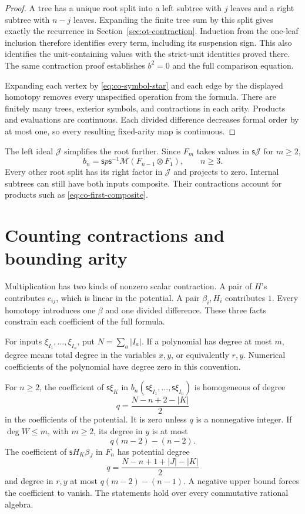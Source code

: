 \begin{proof}
A tree has a unique root split into a left subtree with \(j\) leaves
and a right subtree with \(n-j\) leaves. Expanding the finite tree
sum by this split gives exactly the recurrence in
Section~\ref{sec:ot-contraction}. Induction from the one-leaf inclusion
therefore identifies every term, including its suspension sign.
This also identifies the unit-containing values with the strict-unit
identities proved there. The same contraction proof establishes
\(b^2=0\) and the full comparison equation.

Expanding each vertex by \eqref{eq:co-symbol-star} and each edge
by the displayed homotopy removes every unspecified operation from
the formula. There are finitely many trees, exterior symbols, and
contractions in each arity. Products and evaluations are continuous.
Each divided difference decreases formal order by at most one,
so every resulting fixed-arity map is continuous.
\end{proof}

The left ideal \(\mathcal J\) simplifies the root further.
Since \(F_m\) takes values in \(\mathsf{s}\mathcal J\) for \(m\ge2\),
\[
 b_n=\mathsf{s}p\mathsf{s}^{-1}
              \mathcal M(F_{n-1}\otimes F_1),\qquad n\ge3.
\]
Every other root split has its right factor in \(\mathcal J\)
and projects to zero. Internal subtrees can still have both
inputs composite. Their contractions account for products such
as \eqref{eq:co-first-composite}.

\section{Counting contractions and bounding arity}
\label{sec:co-degree}

Multiplication has two kinds of nonzero scalar contraction.
A pair of \(H\)'s contributes \(c_{ij}\), which is linear in
the potential. A pair \(\beta_i,H_i\) contributes \(1\).
Every homotopy introduces one \(\beta\) and one divided difference.
These three facts constrain each coefficient of the full formula.

For inputs \(\xi_{I_1},\ldots,\xi_{I_n}\), put
\(N=\sum_a|I_a|\). If a polynomial has degree at most \(m\),
degree means total degree in the variables
\(x,y\), or equivalently \(r,y\). Numerical coefficients of the
polynomial have degree zero in this convention.

\begin{theorem}\label{thm:co-degree}
For \(n\ge2\), the coefficient of \(\mathsf{s}\xi_K\) in
\(b_n(\mathsf{s}\xi_{I_1},\ldots,\mathsf{s}\xi_{I_n})\)
is homogeneous of degree
\[
 q=\frac{N-n+2-|K|}{2}
\]
in the coefficients of the potential. It is zero unless \(q\)
is a nonnegative integer. If \(\deg W\le m\), with \(m\ge2\),
its degree in \(y\) is at most
\[
 q(m-2)-(n-2).
\]
The coefficient of \(\mathsf{s}H_K\beta_J\) in \(F_n\) has
potential degree
\[
 q=\frac{N-n+1+|J|-|K|}{2}
\]
and degree in \(r,y\) at most \(q(m-2)-(n-1)\).
A negative upper bound forces the coefficient to vanish.
The statements hold over every commutative rational algebra.
\end{theorem}

